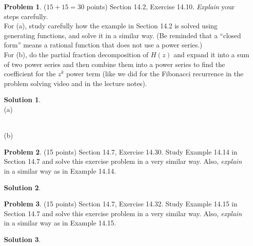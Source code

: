 \documentclass{article}
\theoremstyle{definition}
\newtheorem{problem}{Problem}
\newtheorem*{solution}{Solution}
\begin{document}
\newpage
\begin{problem} ($15+15=30$ points) Section 14.2, Exercise 14.10.
\textit{Explain} your steps carefully.\\[.5ex]
For (a), study carefully how the example in Section 14.2 is solved using generating 
functions, and solve it in a similar way. (Be reminded that a ``closed form'' means a 
rational function that does not use a power series.)\\[.5ex]
For (b), do the partial fraction decomposition of $H(z)$ and expand it into a sum of 
two power series and then combine them into a power series to find the coefficient 
for the $z^k$ power term (like we did for the Fibonacci recurrence in the problem 
solving video and in the lecture notes). 
\end{problem}
\begin{solution}
\ \\
(a)

\ \\
(b)
\end{solution}

\newpage
\begin{problem} (15 points) Section 14.7, Exercise 14.30.  Study Example 14.14
in Section 14.7 and solve this exercise problem in a very similar way.  Also, 
\textit{explain} in a similar way as in Example 14.14.
\end{problem}
\begin{solution}
\end{solution}

\newpage
\begin{problem} (15 points) Section 14.7, Exercise 14.32.  Study Example 14.15
in Section 14.7 and solve this exercise problem in a very similar way.  Also, 
\textit{explain} in a similar way as in Example 14.15.
\end{problem}
\begin{solution}
\end{solution}
\end{document}
